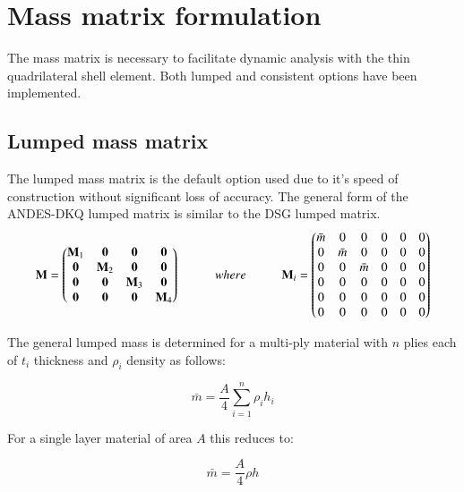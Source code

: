 \section{Mass matrix formulation}

The mass matrix is necessary to facilitate dynamic analysis with the thin quadrilateral shell element. Both lumped and consistent options have been implemented.

\subsection{Lumped mass matrix}
The lumped mass matrix is the default option used due to it's speed of construction without significant loss of accuracy. The general form of the ANDES-DKQ lumped matrix is similar to the DSG lumped matrix.
\begin{equation} 
\mathbf{M} =  
\begin{pmatrix}
\mathbf{M}_1 & \mathbf{0} & \mathbf{0} & \mathbf{0}\\
\mathbf{0} & \mathbf{M}_2 & \mathbf{0} & \mathbf{0}\\
\mathbf{0} & \mathbf{0} & \mathbf{M}_3 & \mathbf{0}\\
\mathbf{0} &\mathbf{0} & \mathbf{0} & \mathbf{M}_4
\end{pmatrix}
\hspace{10mm}
where
\hspace{10mm}
\mathbf{M}_i =  
\begin{pmatrix}
\bar{m} & 0 & 0 & 0 & 0 & 0\\
0 & \bar{m} & 0 & 0 & 0 & 0\\
0 & 0 & \bar{m} &0 & 0 & 0\\
0 & 0 & 0 & 0 & 0 & 0\\
0 & 0 & 0 & 0 & 0 & 0\\
0 & 0 & 0 & 0 & 0 & 0
\end{pmatrix}
\label{eqqmass1}
\end{equation}

The general lumped mass is determined for a multi-ply material with $n$ plies each of $t_i$ thickness and $\rho_i$ density as follows:

\begin{equation} 
\bar{m} = \frac{A}{4} \sum_{i=1}^n \rho_i h_i
\label{eqqmass2}
\end{equation}

For a single layer material of area $A$ this reduces to:

\begin{equation} 
\bar{m} = \frac{A}{4} \rho h
\label{eqqmass3}
\end{equation}

